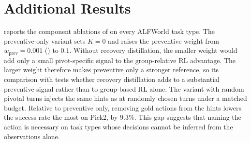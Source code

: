 \section{Additional Results}
\label{app:additional_results}

 reports the component ablations of  on every ALFWorld task type. The preventive-only variant sets $K = 0$ and raises the preventive weight from $w_\text{prev} = 0.001$ () to $0.1$. Without recovery distillation, the smaller weight would add only a small pivot-specific signal to the group-relative RL advantage. The larger weight therefore makes preventive only a stronger reference, so its comparison with \method{} tests whether recovery distillation adds to a substantial preventive signal rather than to group-based RL alone. The variant with random pivotal turns injects the same hints as \method{} at randomly chosen turns under a matched budget. Relative to preventive only, removing gold actions from the hints lowers the success rate the most on Pick2, by $9.3\%$. This gap suggests that naming the action is necessary on task types whose decisions cannot be inferred from the observations alone.

